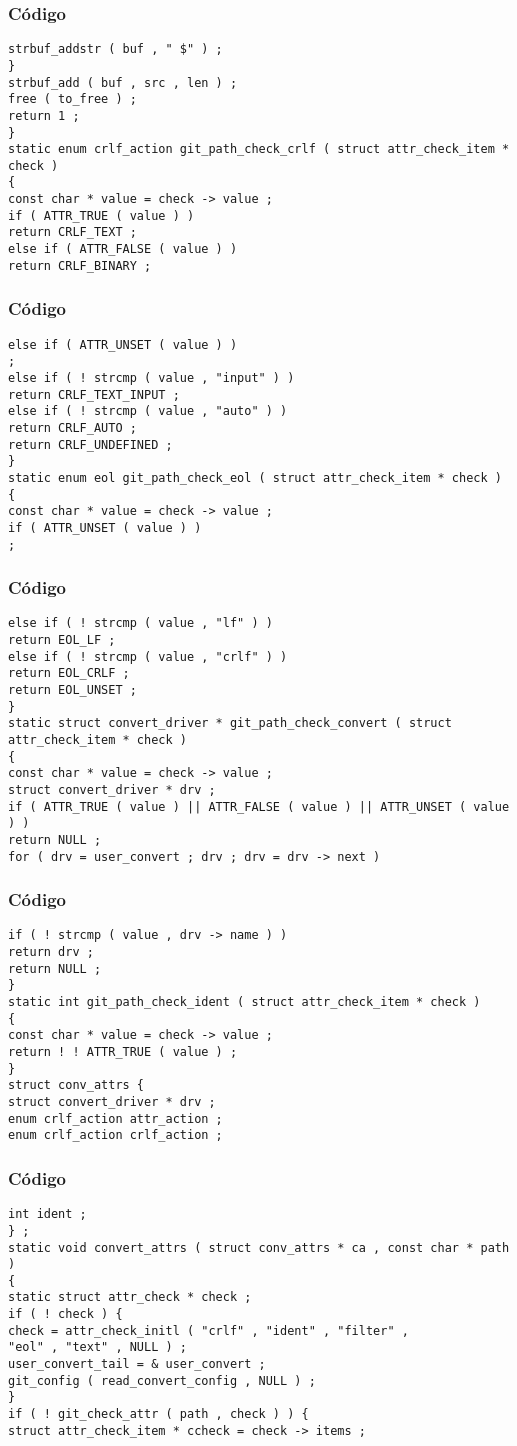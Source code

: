 \documentclass{beamer}
\begin{document}
\begin{frame}[fragile]
\frametitle{C\'odigo}
\begin{verbatim}
strbuf_addstr ( buf , " $" ) ; 
} 
strbuf_add ( buf , src , len ) ; 
free ( to_free ) ; 
return 1 ; 
} 
static enum crlf_action git_path_check_crlf ( struct attr_check_item * check ) 
{ 
const char * value = check -> value ; 
if ( ATTR_TRUE ( value ) ) 
return CRLF_TEXT ; 
else if ( ATTR_FALSE ( value ) ) 
return CRLF_BINARY ; 
\end{verbatim}
\end{frame}
\begin{frame}[fragile]
\frametitle{C\'odigo}
\begin{verbatim}
else if ( ATTR_UNSET ( value ) ) 
; 
else if ( ! strcmp ( value , "input" ) ) 
return CRLF_TEXT_INPUT ; 
else if ( ! strcmp ( value , "auto" ) ) 
return CRLF_AUTO ; 
return CRLF_UNDEFINED ; 
} 
static enum eol git_path_check_eol ( struct attr_check_item * check ) 
{ 
const char * value = check -> value ; 
if ( ATTR_UNSET ( value ) ) 
; 
\end{verbatim}
\end{frame}
\begin{frame}[fragile]
\frametitle{C\'odigo}
\begin{verbatim}
else if ( ! strcmp ( value , "lf" ) ) 
return EOL_LF ; 
else if ( ! strcmp ( value , "crlf" ) ) 
return EOL_CRLF ; 
return EOL_UNSET ; 
} 
static struct convert_driver * git_path_check_convert ( struct attr_check_item * check ) 
{ 
const char * value = check -> value ; 
struct convert_driver * drv ; 
if ( ATTR_TRUE ( value ) || ATTR_FALSE ( value ) || ATTR_UNSET ( value ) ) 
return NULL ; 
for ( drv = user_convert ; drv ; drv = drv -> next ) 
\end{verbatim}
\end{frame}
\begin{frame}[fragile]
\frametitle{C\'odigo}
\begin{verbatim}
if ( ! strcmp ( value , drv -> name ) ) 
return drv ; 
return NULL ; 
} 
static int git_path_check_ident ( struct attr_check_item * check ) 
{ 
const char * value = check -> value ; 
return ! ! ATTR_TRUE ( value ) ; 
} 
struct conv_attrs { 
struct convert_driver * drv ; 
enum crlf_action attr_action ; 
enum crlf_action crlf_action ; 
\end{verbatim}
\end{frame}
\begin{frame}[fragile]
\frametitle{C\'odigo}
\begin{verbatim}
int ident ; 
} ; 
static void convert_attrs ( struct conv_attrs * ca , const char * path ) 
{ 
static struct attr_check * check ; 
if ( ! check ) { 
check = attr_check_initl ( "crlf" , "ident" , "filter" , 
"eol" , "text" , NULL ) ; 
user_convert_tail = & user_convert ; 
git_config ( read_convert_config , NULL ) ; 
} 
if ( ! git_check_attr ( path , check ) ) { 
struct attr_check_item * ccheck = check -> items ; 
\end{verbatim}
\end{frame}
\end{document}
